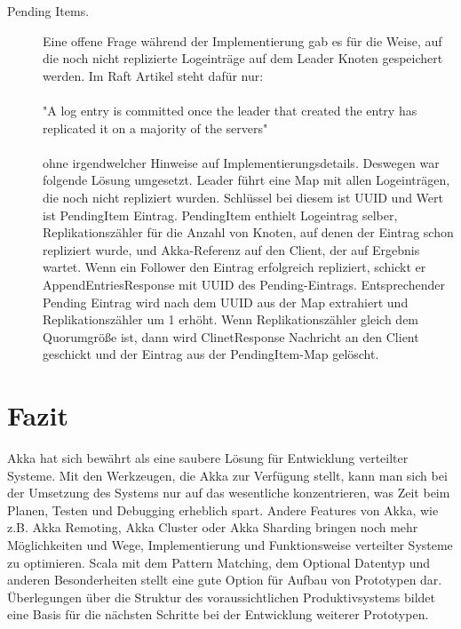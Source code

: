 \begin{description}
	\item[Pending Items.] Eine offene Frage während der Implementierung gab es für die Weise, auf die noch nicht replizierte Logeinträge auf dem Leader Knoten gespeichert werden. Im Raft Artikel steht dafür nur:
	\\
	\\
	"A log entry is committed once the leader that created the entry has replicated it on a majority of the servers"
	\\
	\\
	ohne irgendwelcher Hinweise auf Implementierungsdetails. Deswegen war folgende Lösung umgesetzt. Leader führt eine Map mit allen Logeinträgen, die noch nicht repliziert wurden. Schlüssel bei diesem ist UUID und Wert ist PendingItem Eintrag. PendingItem enthielt Logeintrag selber, Replikationszähler für die Anzahl von Knoten, auf denen der Eintrag schon repliziert wurde, und Akka-Referenz auf den Client, der auf Ergebnis wartet. Wenn ein Follower den Eintrag erfolgreich repliziert, schickt er AppendEntriesResponse mit UUID des Pending-Eintrags. Entsprechender Pending Eintrag wird nach dem UUID aus der Map extrahiert und Replikationszähler um 1 erhöht. Wenn Replikationszähler gleich dem Quorumgröße ist, dann wird ClinetResponse Nachricht an den Client geschickt und der Eintrag aus der PendingItem-Map gelöscht.
\end{description}

\section{Fazit}

Akka hat sich bewährt als eine saubere Lösung für Entwicklung verteilter Systeme. Mit den Werkzeugen, die Akka zur Verfügung stellt, kann man sich bei der Umsetzung des Systems nur auf das wesentliche konzentrieren, was Zeit beim Planen, Testen und Debugging erheblich spart. Andere Features von Akka, wie z.B. Akka Remoting, Akka Cluster oder Akka Sharding bringen noch mehr Möglichkeiten und Wege, Implementierung und Funktionsweise verteilter Systeme zu optimieren. Scala mit dem Pattern Matching, dem Optional Datentyp und anderen Besonderheiten stellt eine gute Option für Aufbau von Prototypen dar. Überlegungen über die Struktur des voraussichtlichen Produktivsystems bildet eine Basis für die nächsten Schritte bei der Entwicklung weiterer Prototypen.